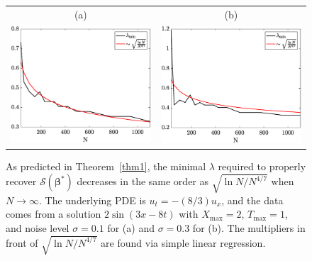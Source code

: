 \documentclass[a4paper,11pt]{article}
\newcommand{\bbeta}{\bm{\beta}}
\newcommand{\mS}{\mathcal{S}}
\begin{document}
\begin{figure}
\centering
\begin{tabular}{cc}
(a)	& (b)\\
\includegraphics[scale=0.4]{Figures/transport_lambdaexp_0_3.eps}	&
\includegraphics[scale=0.4]{Figures/transport_lambdaexp_1.eps}
\end{tabular}
\caption{As predicted in Theorem~\ref{thm1}, the minimal $\lambda$ required to properly recover $\mS(\bbeta^*)$ decreases in the same order as $\sqrt{\ln N/N^{4/7}}$ when $N\to\infty$. The underlying PDE is $u_t=-(8/3)u_x$, and the data comes from a solution $2\sin(3x-8t)$ with $X_{\max}=2$, $T_{\max}=1$, and noise level $\sigma=0.1$ for (a) and $\sigma=0.3$ for (b). The multipliers in front of $\sqrt{\ln N/N^{4/7}}$ are found via simple linear regression.}\label{fig.advlambda}
\end{figure}
\end{document}
